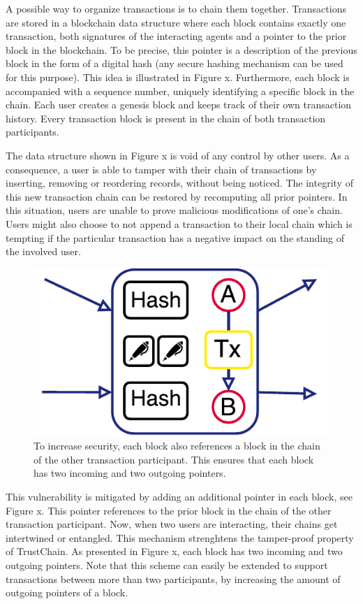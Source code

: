 \documentclass[USenglish]{article}
\begin{document}
A possible way to organize transactions is to chain them together.
Transactions are stored in a blockchain data structure where each block contains exactly one transaction, both signatures of the interacting agents and a pointer to the prior block in the blockchain.
To be precise, this pointer is a description of the previous block in the form of a digital hash (any secure hashing mechanism can be used for this purpose).
This idea is illustrated in Figure x.
Furthermore, each block is accompanied with a sequence number, uniquely identifying a specific block in the chain.
Each user creates a genesis block and keeps track of their own transaction history.
Every transaction block is present in the chain of both transaction participants.

The data structure shown in Figure x is void of any control by other users. As a consequence, a user is able to tamper with their chain of transactions by inserting, removing or reordering records, without being noticed.
The integrity of this new transaction chain can be restored by recomputing all prior pointers.
In this situation, users are unable to prove malicious modifications of one's chain.
Users might also choose to not append a transaction to their local chain which is tempting if the particular transaction has a negative impact on the standing of the involved user.

\begin{figure}[h!]
	\centering
	\includegraphics[width=0.5\columnwidth]{assets/trustchain_tutorial_3}
	\caption{To increase security, each block also references a block in the chain of the other transaction participant. This ensures that each block has two incoming and two outgoing pointers.}
	\label{fig:trustchain_tutorial_3}
\end{figure}

This vulnerability is mitigated by adding an additional pointer in each block, see Figure x.
This pointer references to the prior block in the chain of the other transaction participant.
Now, when two users are interacting, their chains get intertwined or entangled.
This mechanism strenghtens the tamper-proof property of TrustChain.
As presented in Figure x, each block has two incoming and two outgoing pointers.
Note that this scheme can easily be extended to support transactions between more than two participants, by increasing the amount of outgoing pointers of a block.
\end{document}
